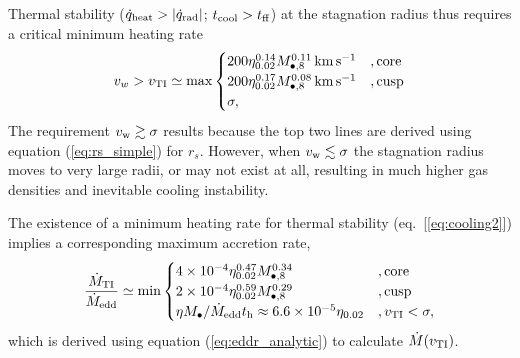 \documentclass[usenatbib,fleqn]{mn2e}
\begin{document}
Thermal stability ($\dot{q}_{\rm heat} > |\dot{q}_{\rm rad}|$; $t_{\rm
  cool} > t_{\rm ff}$) at the stagnation radius thus requires a
critical minimum heating rate
\begin{align}
v_{w} > v_{\rm TI} \simeq
  {\rm max}\begin{cases}
   200 \eta_{0.02}^{0.14} M_{\bullet,8}^{0.11}\,{\rm km\,s^{-1}}  &, \text{core}\\
   200 \eta_{0.02}^{0.17} M_{\bullet,8}^{0.08}\,{\rm km\,s^{-1}}   &, \text{cusp}\\
\sigma,     
  \end{cases}
  \label{eq:cooling3}
\end{align}
The requirement $v_{\rm w} \gtrsim \sigma$ results because the top two lines are derived using equation (\ref{eq:rs_simple}) for $r_s$.  However, when $v_{\rm w} \lesssim \sigma$ the stagnation radius moves to very large radii, or may not exist at all, resulting in much higher gas densities and inevitable cooling instability. 

The existence of a minimum heating rate for thermal stability (eq.~[\ref{eq:cooling2}]) implies a corresponding maximum accretion rate,
\begin{align}
\frac{\dot{M}_{\rm TI}}{\dot{M}_{\rm edd}} \simeq
  {\rm min}\begin{cases}
   4\times 10^{-4} \eta_{0.02}^{0.47} M_{\bullet,8}^{0.34} &, \text{core}\\
   2\times 10^{-4} \eta_{0.02}^{0.59} M_{\bullet,8}^{0.29}    &, \text{cusp}\\
\eta M_{\bullet}/\dot{M}_{\rm edd}t_{\rm h} \approx 6. 6\times 10^{-5}\eta_{0.02}&, v_{\rm TI} < \sigma,
  \end{cases}
  \label{eq:Mdotmax}
\end{align}
which is derived using equation (\ref{eq:eddr_analytic}) to calculate $\dot{M}(v_{\rm TI})$.



\end{document}
